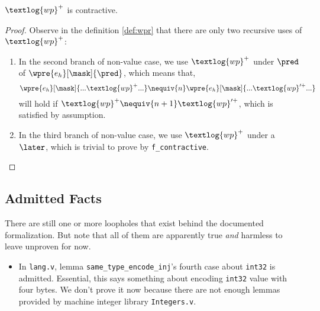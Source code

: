 \begin{lemma}
$\textlog{wp}^{+}$ is contractive.
\end{lemma}
\begin{proof}
  Observe in the definition \ref{def:wpr} that there are only two recursive uses of $\textlog{wp}^{+}$:
  \begin{enumerate}
    \item In the second branch of non-value case, we use $\textlog{wp}^{+}$ under $\pred$ of $\wpre{e_h}[\mask]{\pred}$,
    which means that, 
    \[\wpre{e_h}[\mask]{ ... \textlog{wp}^{+} ... } \nequiv{n} \wpre{e_h}[\mask]{ ... \textlog{wp}'^{+} ... } \]
    will hold if \( \textlog{wp}^{+} \nequiv{n + 1} \textlog{wp}'^{+} \), which is satisfied by assumption.
    \item In the third branch of non-value case, we use $\textlog{wp}^{+}$ under a $\later$, which is trivial to prove
    by \texttt{f\_contractive}.
  \end{enumerate}
\end{proof}

\subsection{Admitted Facts}

There are still one or more loopholes that exist behind the documented formalization.
But note that all of them are apparently true \emph{and} harmless to leave unproven for now.

\begin{itemize}
\item In \texttt{lang.v}, lemma \texttt{same\_type\_encode\_inj}'s fourth case about \texttt{int32} is admitted.
  Essential, this says something about encoding \texttt{int32} value with four bytes.
  We don't prove it now because there are not enough lemmas provided by machine integer library \texttt{Integers.v}.
\end{itemize}

